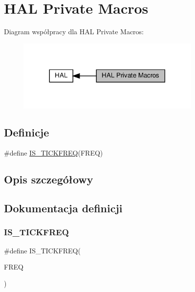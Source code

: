 \hypertarget{group___h_a_l___private___macros}{}\section{H\+AL Private Macros}
\label{group___h_a_l___private___macros}
Diagram współpracy dla H\+AL Private Macros\+:\nopagebreak
\begin{figure}[H]
\begin{center}
\leavevmode
\includegraphics[width=257pt]{group___h_a_l___private___macros}
\end{center}
\end{figure}
\subsection*{Definicje}
\begin{DoxyCompactItemize}
\item 
\#define \hyperlink{group___h_a_l___private___macros_ga2a86bf8a89ad75716cd92e932a8ae71e}{I\+S\+\_\+\+T\+I\+C\+K\+F\+R\+EQ}(F\+R\+EQ)
\end{DoxyCompactItemize}


\subsection{Opis szczegółowy}


\subsection{Dokumentacja definicji}
\mbox{\label{group___h_a_l___private___macros_ga2a86bf8a89ad75716cd92e932a8ae71e}} 
\subsubsection{\texorpdfstring{I\+S\+\_\+\+T\+I\+C\+K\+F\+R\+EQ}{IS\_TICKFREQ}}
{\footnotesize\ttfamily \#define I\+S\+\_\+\+T\+I\+C\+K\+F\+R\+EQ(\begin{DoxyParamCaption}\item[{}]{F\+R\+EQ }\end{DoxyParamCaption})}

